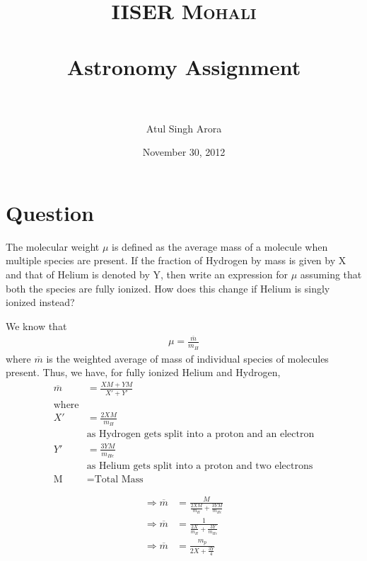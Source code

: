 \documentclass[paper=a4, fontsize=11pt]{scrartcl} %
\title{	
\normalfont \normalsize 
\textsc{IISER Mohali} \\ [25pt] %
\horrule{0.5pt} \\[0.4cm] %
\huge Astronomy Assignment \\ %
\horrule{2pt} \\[0.5cm] %
}
\author{Atul Singh Arora} %
\date{\normalsize November 30, 2012} %
\numberwithin{equation}{section} %
\numberwithin{figure}{section} %
\numberwithin{table}{section} %
\begin{document}
\maketitle %

\everymath{\displaystyle}


\section{Question}
	The molecular weight $\mu$ is defined as the average mass of a molecule when multiple species are present. If the fraction of Hydrogen by mass is given by X and that of Helium is denoted by Y, then write an expression for $\mu$ assuming that both the species are fully ionized. How does this change if Helium is singly ionized instead?\\
	\par
	We know that
	\begin{align}
		\mu=\frac{\overline{m}}{m_H}
	\end{align}
	where $\overline{m}$ is the weighted average of mass of individual species of molecules present. Thus, we have, for fully ionized Helium and Hydrogen,
	\begin{equation}
	\begin{split}
		\overline{m} & =\frac{XM + YM}{X'+Y'} \\
		\text{where}\\
		X' & = \frac{2XM}{m_H} \\
		& \text{as Hydrogen gets split into a proton and an electron} \\
		Y' & =\frac{3YM}{m_{He}} \\
		& \text{as Helium gets split into a proton and two electrons} \\
		\text{M} &= \text{Total Mass}
	\end{split}
	\end{equation}

	\begin{equation}
	\begin{split}
		\Rightarrow \overline{m} & = \frac{M}{\frac{2XM}{m_H} + \frac{3YM}{m_{He}}} \\
		\Rightarrow \overline{m} & = \frac{1}{\frac{2X}{m_H} + \frac{3Y}{m_{He}}} \\
		\Rightarrow \overline{m} & = \frac{m_p}{2X + \frac{3Y}{4}}	
	\end{split}
	\end{equation}
\end{document}
